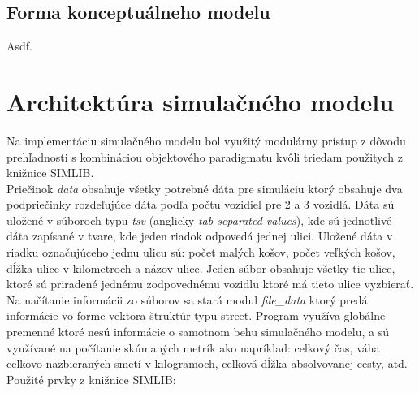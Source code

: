 \documentclass[11pt,a4paper]{article}
\begin{document}
    \subsection{Forma konceptuálneho modelu}

        Asdf.


\section{Architektúra simulačného modelu}

    \indent Na implementáciu simulačného modelu bol využitý modulárny prístup z dôvodu prehľadnosti s kombináciou objektového paradigmatu kvôli triedam použitych z knižnice SIMLIB.\\[0.4em]
    \indent Priečinok \textit{data} obsahuje všetky potrebné dáta pre simuláciu ktorý obsahuje dva podpriečinky rozdeľujúce dáta podľa počtu vozidiel pre 2 a 3 vozidlá. Dáta sú uložené v súboroch typu \textit{tsv} (anglicky \textit{tab-separated values}), kde sú jednotlivé dáta zapísané v tvare, kde jeden riadok odpovedá jednej ulici. Uložené dáta v riadku označujúceho jednu ulicu sú: počet malých košov, počet veľkých košov, dĺžka ulice v kilometroch a názov ulice. Jeden súbor obsahuje všetky tie ulice, ktoré sú priradené jednému zodpovednému vozidlu ktoré má tieto ulice vyzbierať.\\[0.4em]
    \indent Na načítanie informácii zo súborov sa stará modul \textit{file\_data} ktorý predá informácie vo forme vektora štruktúr typu street. Program využíva globálne premenné ktoré nesú informácie o samotnom behu simulačného modelu, a sú využívané na počítanie skúmaných metrík ako napríklad: celkový čas, váha celkovo nazbieraných smetí v kilogramoch, celková dĺžka absolvovanej cesty, atď.\\[0.4em]
    \noindent Použité prvky z knižnice SIMLIB:
\end{document}
